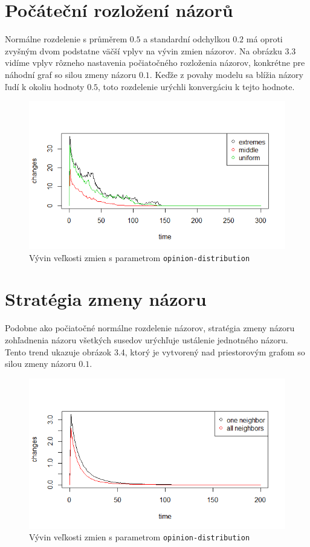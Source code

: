 \documentclass[10pt,a4paper]{report}
\begin{document}
\section{Počáteční rozložení názorů}
Normálne rozdelenie s průměrem $0.5$ a standardní odchylkou $0.2$ má oproti zvyšným dvom podstatne väčší vplyv na vývin zmien názorov. Na obrázku 3.3 vidíme vplyv rôzneho nastavenia počiatočného rozloženia názorov, konkrétne pre náhodní graf so silou zmeny názoru $0.1$. Keďže z povahy modelu sa blížia názory ľudí k okoliu hodnoty $0.5$, toto rozdelenie urýchli konvergáciu k tejto hodnote.
\begin{figure}
  \includegraphics[width=\textwidth]{plots/small-world-g/smallWorldDistribution.png}
  \caption{Vývin veľkosti zmien s parametrom \texttt{opinion-distribution} }
\end{figure}


\section{Stratégia zmeny názoru}
Podobne ako počiatočné normálne rozdelenie názorov, stratégia zmeny názoru zohľadnenia názoru všetkých susedov urýchľuje ustálenie jednotného názoru. Tento trend ukazuje obrázok 3.4, ktorý je vytvorený nad priestorovým grafom so silou zmeny názoru $0.1$.  
\begin{figure}
  \includegraphics[width=\textwidth]{plots/random-g/randomAllVsOne.png}
  \caption{Vývin veľkosti zmien s parametrom \texttt{opinion-distribution} }
\end{figure}
\end{document}
